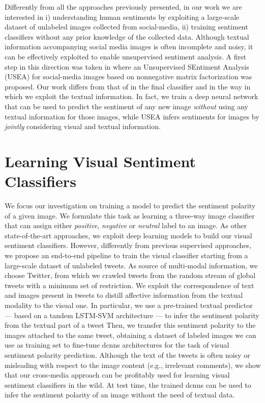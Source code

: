 Differently from all the approaches previously presented, in our work we are interested in i) understanding human sentiments by exploiting a large-scale dataset of unlabeled images collected from social-media, ii) training sentiment classifiers without any prior knowledge of the collected data.
Although textual information accompanying social media images is often incomplete and noisy, it can be effectively exploited to enable unsupervised sentiment analysis.
A first step in this direction was taken in \cite{wang2015unsupervised} where an Unsupervised SEntiment Analysis (USEA) for social-media images based on nonnegative matrix factorization was proposed.
Our work differs from that of \citet{wang2015unsupervised} in the final classifier and in the way in which we exploit the textual information.
In fact, we train a deep neural network that can be used to predict the sentiment of any new image \emph{without} using any textual information for those images, while USEA infers sentiments for images by \emph{jointly} considering visual and textual information.


\section{Learning Visual Sentiment Classifiers}

We focus our investigation on training a model to predict the sentiment polarity of a given image.
We formulate this task as learning a three-way image classifier that can assign either \emph{positive}, \emph{negative} or \emph{neutral} label to an image.
As other state-of-the-art approaches, we exploit deep learning models to build our visual sentiment classifiers.
However, differently from previous supervised approaches, we propose an end-to-end pipeline to train the visual classifier starting from a large-scale dataset of unlabeled tweets.
As source of multi-modal information, we choose Twitter, from which we crawled tweets from the random stream of global tweets with a minimum set of restriction.
We exploit the correspondence of text and images present in tweets to distill affective information from the textual modality to the visual one.
In particular, we use a pre-trained textual predictor --- based on a tandem \gls{LSTM}-\gls{SVM} architecture --- to infer the sentiment polarity from the textual part of a tweet
Then, we transfer this sentiment polarity to the images attached to the same tweet, obtaining a dataset of labeled images we can use as training set to fine-tune \glspl{dcnn} architectures for the task of visual sentiment polarity prediction.
Although the text of the tweets is often noisy or misleading with respect to the image content (e.g., irrelevant comments), we show that our cross-media approach can be profitably used for learning visual sentiment classifiers in the wild.
At test time, the trained \glspl{dcnn} can be used to infer the sentiment polarity of an image without the need of textual data.


